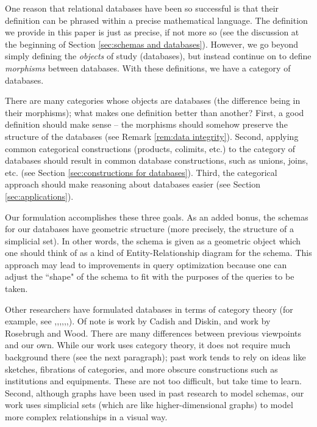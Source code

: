\documentclass{amsart}
\begin{document}
One reason that relational databases have been so successful is that their definition can be phrased within a precise mathematical language.  The definition we provide in this paper is just as precise, if not more so (see the discussion at the beginning of Section \ref{sec:schemas and databases}).  However, we go beyond simply defining the {\em objects} of study (databases), but instead continue on to define {\em morphisms} between databases.  With these definitions, we have a category of databases.

There are many categories whose objects are databases (the difference being in their morphisms); what makes one definition better than another?  First, a good definition should make sense -- the morphisms should somehow preserve the structure of the databases (see Remark \ref{rem:data integrity}).  Second, applying common categorical constructions (products, colimits, etc.) to the category of databases should result in common database constructions, such as unions, joins, etc. (see Section \ref{sec:constructions for databases}).  Third, the categorical approach should make reasoning about databases easier (see Section \ref{sec:applications}).  

Our formulation accomplishes these three goals.  As an added bonus, the schemas for our databases have geometric structure (more precisely, the structure of a simplicial set).  In other words, the schema is given as a geometric object which one should think of as a kind of Entity-Relationship diagram for the schema.  This approach may lead to improvements in query optimization because one can adjust the ``shape" of the schema to fit with the purposes of the queries to be taken.

Other researchers have formulated databases in terms of category theory (for example, see \cite{RW},\cite{JRW},\cite{PS},\cite{Ber},\cite{DK},\cite{Dis},\cite{GB}).  Of note is work by Cadish and Diskin, and work by Rosebrugh and Wood.  There are many differences between previous viewpoints and our own.  While our work uses category theory, it does not require much background there (see the next paragraph); past work tends to rely on ideas like sketches, fibrations of categories, and more obscure constructions such as institutions and equipments.  These are not too difficult, but take time to learn.  Second, although graphs have been used in past research to model schemas, our work uses simplicial sets (which are like higher-dimensional graphs) to model more complex relationships in a visual way.  
\end{document}
